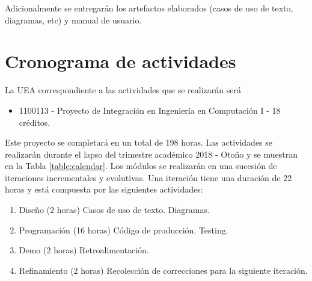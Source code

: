 Adicionalmente se entregar\'an los artefactos elaborados (casos de uso de texto, diagramas, etc) y manual de usuario.

\section{Cronograma de actividades}

La UEA correspondiente a las actividades que se realizar\'an ser\'a
\begin{itemize}
	\item 1100113 - Proyecto de Integración en Ingeniería en Computación I - 18 créditos.
\end{itemize} 
 Este proyecto se completar\'a en un total de 198 horas. Las actividades se realizar\'an durante el lapso del trimestre académico 2018 - Otoño y se muestran en la Tabla \ref{table:calendar}. Los módulos se realizarán en una sucesión de iteraciones incrementales y evolutivas. Una iteración tiene una duración de 22 horas y est\'a compuesta por las siguientes actividades: 
\begin{enumerate}
	\item Diseño (2 horas)
	\subitem Casos de uso de texto.
	\subitem Diagramas.
	\item Programación (16 horas)
	\subitem Código de producción.
	\subitem Testing.
	\item Demo (2 horas)
	\subitem Retroalimentación.
	\item Refinamiento (2 horas)
	\subitem Recolección de correcciones para la siguiente iteración.
\end{enumerate}

\newcommand\rownumber{\stepcounter{iteracion}\arabic{iteracion}}



